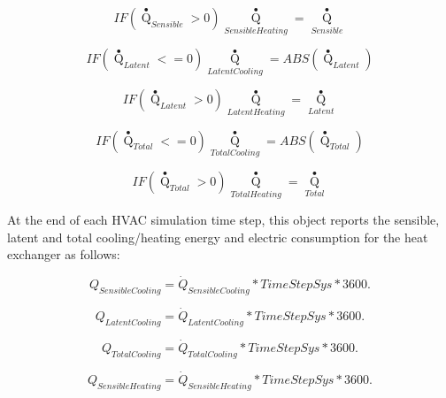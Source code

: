 \begin{equation}
IF\left( {{{\mathop Q\limits^ \bullet  }_{Sensible}} > 0} \right){\mathop Q\limits^ \bullet_{SensibleHeating}} = {\mathop Q\limits^ \bullet_{Sensible}}
\end{equation}

\begin{equation}
IF\left( {{{\mathop Q\limits^ \bullet  }_{Latent}} <  = 0} \right){\mathop Q\limits^ \bullet_{LatentCooling}} = ABS\left( {{{\mathop Q\limits^ \bullet  }_{Latent}}} \right)
\end{equation}

\begin{equation}
IF\left( {{{\mathop Q\limits^ \bullet  }_{Latent}} > 0} \right){\mathop Q\limits^ \bullet_{LatentHeating}} = {\mathop Q\limits^ \bullet_{Latent}}
\end{equation}

\begin{equation}
IF\left( {{{\mathop Q\limits^ \bullet  }_{Total}} <  = 0} \right){\mathop Q\limits^ \bullet_{TotalCooling}} = ABS\left( {{{\mathop Q\limits^ \bullet  }_{Total}}} \right)
\end{equation}

\begin{equation}
IF\left( {{{\mathop Q\limits^ \bullet  }_{Total}} > 0} \right){\mathop Q\limits^ \bullet_{TotalHeating}} = {\mathop Q\limits^ \bullet_{Total}}
\end{equation}

At the end of each HVAC simulation time step, this object reports the sensible, latent and total cooling/heating energy and electric consumption for the heat exchanger as follows:

\begin{equation}
{Q_{SensibleCooling}} = {\dot Q_{SensibleCooling}}*TimeStepSys*3600.
\end{equation}

\begin{equation}
{Q_{LatentCooling}} = {\dot Q_{LatentCooling}}*TimeStepSys*3600.
\end{equation}

\begin{equation}
{Q_{TotalCooling}} = {\dot Q_{TotalCooling}}*TimeStepSys*3600.
\end{equation}

\begin{equation}
{Q_{SensibleHeating}} = {\dot Q_{SensibleHeating}}*TimeStepSys*3600.
\end{equation}

